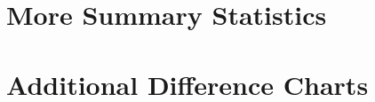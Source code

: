 \documentclass[12pt,letterpaper]{article}
\begin{document}
\newpage
\appendix
\FloatBarrier
\section{More Summary Statistics}



\begin{landscape}

\end{landscape}


\FloatBarrier
\newpage
\section{Additional Difference Charts}







\end{document}
